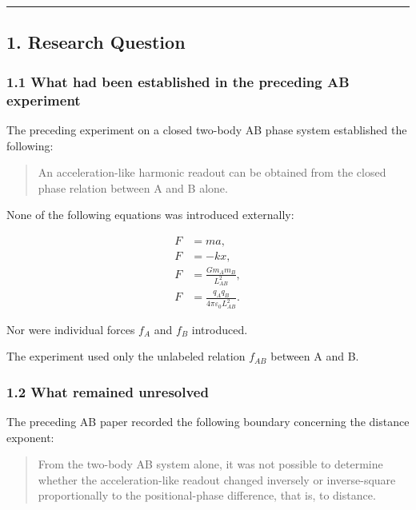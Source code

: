 \documentclass[
  a4paper,
]{article}
\begin{document}
\begin{center}\rule{0.5\linewidth}{0.5pt}\end{center}

\subsection{1. Research Question}\label{research-question}

\subsubsection{1.1 What had been established in the preceding AB
experiment}\label{what-had-been-established-in-the-preceding-ab-experiment}

The preceding experiment on a closed two-body AB phase system
established the following:

\begin{quote}
An acceleration-like harmonic readout can be obtained from the closed
phase relation between A and B alone.
\end{quote}

None of the following equations was introduced externally:

\[
\begin{aligned}
F&=ma,\\
F&=-kx,\\
F&=\frac{Gm_A m_B}{L_{AB}^2},\\
F&=\frac{q_Aq_B}{4\pi\varepsilon_0L_{AB}^2}.
\end{aligned}
\]

Nor were individual forces \(f_A\) and \(f_B\) introduced.

The experiment used only the unlabeled relation \(f_{AB}\) between A and
B.

\subsubsection{1.2 What remained
unresolved}\label{what-remained-unresolved}

The preceding AB paper recorded the following boundary concerning the
distance exponent:

\begin{quote}
From the two-body AB system alone, it was not possible to determine
whether the acceleration-like readout changed inversely or
inverse-square proportionally to the positional-phase difference, that
is, to distance.
\end{quote}
\end{document}
